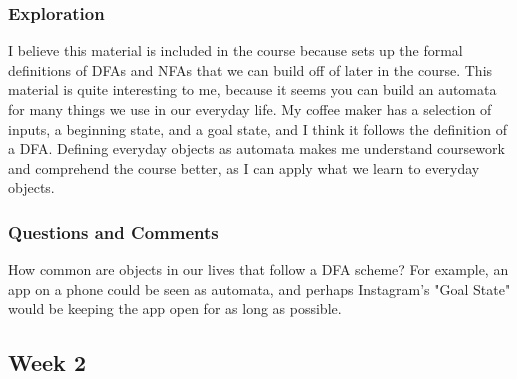 \documentclass{article}
\theoremstyle{theorem}
\theoremstyle{definition}
\theoremstyle{remark}
\begin{document}
\subsubsection{Exploration}
I believe this material is included in the course because sets up the formal definitions of DFAs and NFAs that we can build off of later in the course. This material is quite interesting to me, because it seems you can build an automata for many things we use in our everyday life. My coffee maker has a selection of inputs, a beginning state, and a goal state, and I think it follows the definition of a DFA. Defining everyday objects as automata makes me understand coursework and comprehend the course better, as I can apply what we learn to everyday objects.

\subsubsection{Questions and Comments}
How common are objects in our lives that follow a DFA scheme? For example, an app on a phone could be seen as automata, and perhaps Instagram's "Goal State" would be keeping the app open for as long as possible.

\subsection{Week 2}
\end{document}

